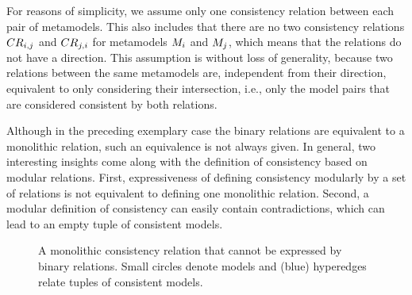 For reasons of simplicity, we assume only one consistency relation between each pair of metamodels.
This also includes that there are no two consistency relations $\consistencyrelation{CR}{i,j}$ and $\consistencyrelation{CR}{j,i}$ for metamodels $\metamodel{M}{i}$ and $\metamodel{M}{j}$, which means that the relations do not have a direction.
This assumption is without loss of generality, because two relations between the same metamodels are, independent from their direction, equivalent to only considering their intersection, i.e., only the model pairs that are considered consistent by both relations.


Although in the preceding exemplary case the binary relations are equivalent to a monolithic relation, such an equivalence is not always given. In general, two interesting insights come along with the definition of consistency based on modular relations. First, expressiveness of defining consistency modularly by a set of relations is not equivalent to defining one monolithic relation. Second, a modular definition of consistency can easily contain contradictions, which can lead to an empty tuple of consistent models.

\begin{figure}
    \centering
    
    \caption[Monolithic consistency relation that cannot be modularized]{A monolithic consistency relation that cannot be expressed by binary relations. Small circles denote models and (blue) hyperedges relate tuples of consistent models.}
    \label{fig:correctness:binary_definable}
\end{figure}

